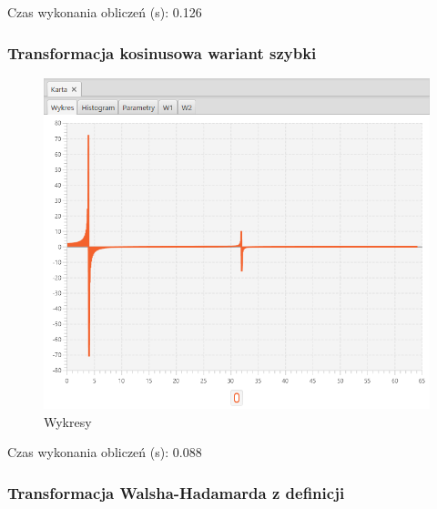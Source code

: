 \documentclass[12pt]{article}
\begin{document}
{{{                Czas wykonania obliczeń (s): 0.126
            }
            \newpage

            \subsubsection{Transformacja kosinusowa wariant szybki} {

                \begin{figure}[H]
                    \centering
                    \includegraphics[width=\textwidth]{img/result/s3/05/data_draw_5_sinus_sampling_trans_s3_data_205938.png}
                    \caption{Wykresy}
                \end{figure}

                Czas wykonania obliczeń (s): 0.088
            }
            \newpage

            \subsubsection{Transformacja Walsha-Hadamarda z definicji} {

}}}
\end{document}
